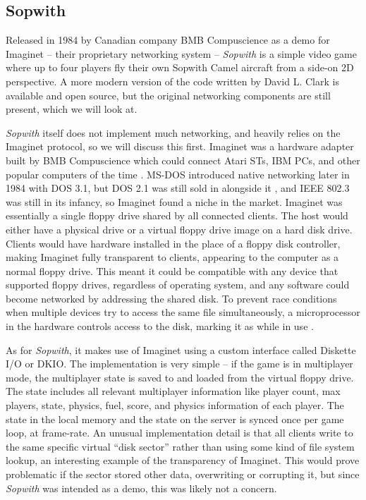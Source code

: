 \label{subsec:sopwith}

\subsection{Sopwith}

Released in 1984 by Canadian company BMB Compuscience as a demo for Imaginet -- their proprietary networking system -- \textit{Sopwith} is a simple video game where up to four players fly their own Sopwith Camel aircraft from a side-on 2D perspective. A more modern version of the code written by David L. Clark is available and open source, but the original networking components are still present, which we will look at.

\textit{Sopwith} itself does not implement much networking, and heavily relies on the Imaginet protocol, so we will discuss this first. Imaginet was a hardware adapter built by BMB Compuscience which could connect Atari STs, IBM PCs, and other popular computers of the time \cite{colead}. MS-DOS introduced native networking later in 1984 with DOS 3.1, but DOS 2.1 was still sold in alongside it \cite{dosonline}, and IEEE 802.3  was still in its infancy, so Imaginet found a niche in the market. Imaginet was essentially a single floppy drive shared by all connected clients. The host would either have a physical drive or a virtual floppy drive image on a hard disk drive. Clients would have hardware installed in the place of a floppy disk controller, making Imaginet fully transparent to clients, appearing to the computer as a normal floppy drive. This meant it could be compatible with any device that supported floppy drives, regardless of operating system, and any software could become networked by addressing the shared disk. To prevent race conditions when multiple devices try to access the same file simultaneously, a microprocessor in the hardware controls access to the disk, marking it as  while in use \cite{imaginetpatent}.

As for \textit{Sopwith}, it makes use of Imaginet using a custom interface called Diskette I/O or DKIO. The implementation is very simple -- if the game is in multiplayer mode, the multiplayer state is saved to and loaded from the virtual floppy drive. The state includes all relevant multiplayer information like player count, max players, state, physics, fuel, score, and physics information of each player. The state in the local memory and the state on the server is synced once per game loop, \ie at frame-rate. An unusual implementation detail is that all clients write to the same specific virtual ``disk sector'' rather than using some kind of file system lookup, an interesting example of the transparency of Imaginet. This would prove problematic if the sector stored other data, overwriting or corrupting it, but since \textit{Sopwith} was intended as a demo, this was likely not a concern.

